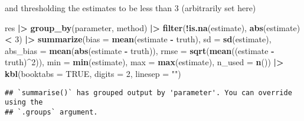 \documentclass[
]{article}
\newenvironment{Shaded}{\begin{snugshade}}{\end{snugshade}}
\newcommand{\AttributeTok}[1]{\textcolor[rgb]{0.13,0.29,0.53}{#1}}
\newcommand{\ConstantTok}[1]{\textcolor[rgb]{0.56,0.35,0.01}{#1}}
\newcommand{\DecValTok}[1]{\textcolor[rgb]{0.00,0.00,0.81}{#1}}
\newcommand{\FunctionTok}[1]{\textcolor[rgb]{0.13,0.29,0.53}{\textbf{#1}}}
\newcommand{\NormalTok}[1]{#1}
\newcommand{\SpecialCharTok}[1]{\textcolor[rgb]{0.81,0.36,0.00}{\textbf{#1}}}
\newcommand{\StringTok}[1]{\textcolor[rgb]{0.31,0.60,0.02}{#1}}
\begin{document}
and thresholding the estimates to be less than 3 (arbitrarily set here)

\begin{Shaded}
\begin{Highlighting}[]
\NormalTok{res }\SpecialCharTok{|\textgreater{}} \FunctionTok{group\_by}\NormalTok{(parameter, method) }\SpecialCharTok{|\textgreater{}}
    \FunctionTok{filter}\NormalTok{(}\SpecialCharTok{!}\FunctionTok{is.na}\NormalTok{(estimate), }\FunctionTok{abs}\NormalTok{(estimate) }\SpecialCharTok{\textless{}} \DecValTok{3}\NormalTok{) }\SpecialCharTok{|\textgreater{}}
    \FunctionTok{summarize}\NormalTok{(}\AttributeTok{bias =} \FunctionTok{mean}\NormalTok{(estimate }\SpecialCharTok{{-}}\NormalTok{ truth),}
              \AttributeTok{sd =} \FunctionTok{sd}\NormalTok{(estimate),}
              \AttributeTok{abs\_bias =} \FunctionTok{mean}\NormalTok{(}\FunctionTok{abs}\NormalTok{(estimate }\SpecialCharTok{{-}}\NormalTok{ truth)),}
              \AttributeTok{rmse =} \FunctionTok{sqrt}\NormalTok{(}\FunctionTok{mean}\NormalTok{((estimate }\SpecialCharTok{{-}}\NormalTok{ truth)}\SpecialCharTok{\^{}}\DecValTok{2}\NormalTok{)),}
              \AttributeTok{min =} \FunctionTok{min}\NormalTok{(estimate),}
              \AttributeTok{max =} \FunctionTok{max}\NormalTok{(estimate),}
              \AttributeTok{n\_used =} \FunctionTok{n}\NormalTok{()) }\SpecialCharTok{|\textgreater{}}
  \FunctionTok{kbl}\NormalTok{(}\AttributeTok{booktabs =} \ConstantTok{TRUE}\NormalTok{, }\AttributeTok{digits =} \DecValTok{2}\NormalTok{, }\AttributeTok{linesep =} \StringTok{""}\NormalTok{)}
\end{Highlighting}
\end{Shaded}

\begin{verbatim}
## `summarise()` has grouped output by 'parameter'. You can override using the
## `.groups` argument.
\end{verbatim}
\end{document}
